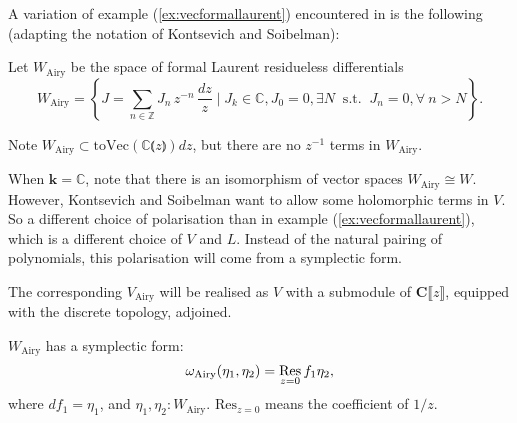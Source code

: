         A variation of example (\ref{ex:vecformallaurent}) encountered in \cite{ks_airy} is the following (adapting the notation of Kontsevich and Soibelman):
        \begin{defn} Let \(  W_{\mathrm{Airy}}\) be the space of formal Laurent residueless differentials
        \[ W_{\mathrm{Airy}}=\left\{ J=\sum_{n\in\mathbb{Z}} J_n \, z^{-n} \, \frac{dz}{z}\mid J_k \in \mathbb{C}, J_0=0, \exists N \;\; \mathrm{s.t.}\;\;  J_n=0, \forall \ n>N\right\}. \]
        \end{defn} 
        Note \( W_{\mathrm{Airy}} \subset  \mathrm{toVec} (\mathbb{C}\lParen z \rParen ) dz\), but there are no \(z^{-1}\) terms in \(W_{\mathrm{Airy}}\).

        
        When \( \mathbf{k} =\mathbb{C}\), note that there is an isomorphism of vector spaces \(W_{\mathrm{Airy}} \cong W\). %
        However, Kontsevich and Soibelman want to allow some holomorphic terms in \(V\). So a different choice of polarisation than in example (\ref{ex:vecformallaurent}), which is a different choice of \(V\) and \(L\). Instead of the natural pairing of polynomials, this polarisation will come from a symplectic form.
        
        The corresponding \( V_{\mathrm{Airy}}\) will be realised as \(V\) with a submodule of \( \mathbf{C}\lBrack z \rBrack\), equipped with the discrete topology, adjoined.
        
        
        
        \begin{prop} \( W_{\mathrm{Airy}}\) has a symplectic form:
        \[ \omega_{\text{Airy}}(\eta_1,\eta_2)=\operatorname*{Res}_{z=0}f_1\eta_2,\] 
        where \(df_1=\eta_1\), and \( \eta_1, \eta_2: W_\text{Airy}\). \( \mathrm{Res}_{z=0} \) means the coefficient of \( 1/z\).
        \end{prop}
        
